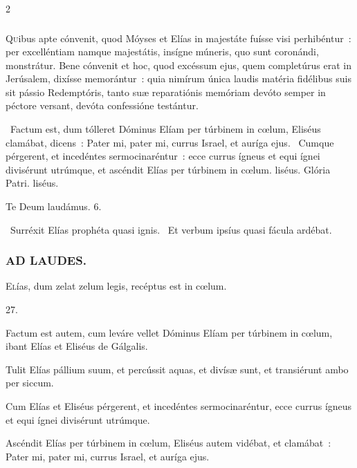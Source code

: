 \documentclass[9pt,twoside]{extarticle}
\begin{document}
\begin{multicols}{2}
{{{\subsubsection*{\center {}}
\lettrine{Q}uibus apte cónvenit, quod Móyses et Elías in majestáte fuísse visi perhibéntur~: per excelléntiam namque majestátis, insígne múneris, quo sunt coronándi, monstrátur. Bene cónvenit et hoc, quod excéssum ejus, quem completúrus erat in Jerúsalem, dixísse memorántur~: quia nimírum única laudis matéria fidélibus suis sit pássio Redemptóris, tanto suæ reparatiónis memóriam devóto semper in péctore versant, devóta confessióne testántur.

\begin{tightlist}{}
\item {}~Factum est, dum tólleret Dóminus Elíam per túrbinem in cœlum, \textred{*} Eliséus clamábat, dicens~: Pater mi, pater mi, currus Israel, et auríga ejus. ~Cumque pérgerent, et incedéntes sermocinaréntur~: ecce currus ígneus et equi ígnei divisérunt utrúmque, et ascéndit Elías per túrbinem in cœlum. liséus. Glória Patri. liséus.
\item Te Deum laudámus. 6.
\item {}~Surréxit Elías prophéta quasi ignis. ~Et verbum ipsíus quasi fácula ardébat.
\end{tightlist}

\subsubsection*{\center \textsc{AD LAUDES.}}
\begin{center}\end{center}
\lettrine{E}lías, dum zelat zelum legis, recéptus est in cœlum.

\begin{tightlist}
\item {} 27.
\item {} Factum est autem, cum leváre vellet Dóminus Elíam per túrbinem in cœlum, ibant Elías et Eliséus de Gálgalis.
\item {} Tulit Elías pállium suum, et percússit aquas, et divísæ sunt, et transiérunt ambo per siccum.
\item {} Cum Elías et Eliséus pérgerent, et incedéntes sermocinaréntur, ecce currus ígneus et equi ígnei divisérunt utrúmque.
\item {} Ascéndit Elías per túrbinem in cœlum, Eliséus autem vidébat, et clamábat~: Pater mi, pater mi, currus Israel, et auríga ejus.
\end{tightlist}

}}}
\end{multicols}
\end{document}
